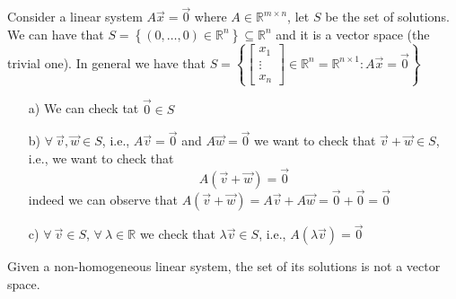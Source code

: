 Consider a linear system $A \vec x = \vec 0$ where $A \in \mathbb{R}^{m \times n}$, let $S$ be the set of solutions. We can have that $S = \left\{ (0, \dots, 0) \in \mathbb{R}^n \right\} \subseteq \mathbb{R}^n$ and it is a vector space (the trivial one). In general we have that $S = \left\{ \begin{bmatrix}
    x_1\\
    \vdots\\
    x_n
\end{bmatrix} \in \mathbb{R}^n = \mathbb{R}^{n \times 1} : A \vec x = \vec 0  \right\}$
\begin{itemize}
    \item[a)] We can check tat $\vec 0 \in S$
    \item[b)] $\forall \ \vec v, \vec w \in S$, i.e., $A \vec v = \vec 0$ and $A \vec w = \vec 0$ we want to check that $\vec v + \vec w \in S$, i.e., we want to check that 
    $$A\left(\vec v + \vec w\right) = \vec 0$$
    indeed we can observe that $A \left( \vec v + \vec w \right) = A \vec v + A \vec w = \vec 0 + \vec 0 = \vec 0$
    \item[c)] $\forall \ \vec v \in S$, $\forall \ \lambda \in \mathbb{R}$ we check that $\lambda \vec v \in S$, i.e., $A \left(\lambda \vec v \right) = \vec 0$ 
\end{itemize}
Given a non-homogeneous linear system, the set of its solutions is not a vector space.

